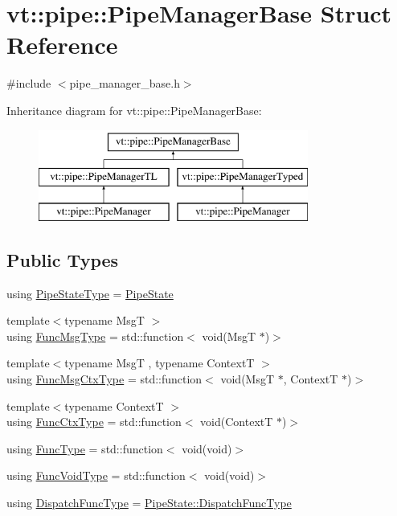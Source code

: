 \hypertarget{structvt_1_1pipe_1_1_pipe_manager_base}{}\section{vt\+:\+:pipe\+:\+:Pipe\+Manager\+Base Struct Reference}
\label{structvt_1_1pipe_1_1_pipe_manager_base}


{\ttfamily \#include $<$pipe\+\_\+manager\+\_\+base.\+h$>$}

Inheritance diagram for vt\+:\+:pipe\+:\+:Pipe\+Manager\+Base\+:\begin{figure}[H]
\begin{center}
\leavevmode
\includegraphics[height=3.000000cm]{structvt_1_1pipe_1_1_pipe_manager_base}
\end{center}
\end{figure}
\subsection*{Public Types}
\begin{DoxyCompactItemize}
\item 
using \hyperlink{structvt_1_1pipe_1_1_pipe_manager_base_a1364798bda487c9fb04879599f96c507}{Pipe\+State\+Type} = \hyperlink{structvt_1_1pipe_1_1_pipe_state}{Pipe\+State}
\item 
{\footnotesize template$<$typename MsgT $>$ }\\using \hyperlink{structvt_1_1pipe_1_1_pipe_manager_base_aa54eee64ab32a27777a672d49eb861f4}{Func\+Msg\+Type} = std\+::function$<$ void(MsgT $\ast$)$>$
\item 
{\footnotesize template$<$typename MsgT , typename ContextT $>$ }\\using \hyperlink{structvt_1_1pipe_1_1_pipe_manager_base_a73fdf82ece0411b3dc644c99b763f7a9}{Func\+Msg\+Ctx\+Type} = std\+::function$<$ void(MsgT $\ast$, ContextT $\ast$)$>$
\item 
{\footnotesize template$<$typename ContextT $>$ }\\using \hyperlink{structvt_1_1pipe_1_1_pipe_manager_base_ad8463823b6b4cfdb67c119d6d22e3bac}{Func\+Ctx\+Type} = std\+::function$<$ void(ContextT $\ast$)$>$
\item 
using \hyperlink{structvt_1_1pipe_1_1_pipe_manager_base_a7ddc75a14fa50cd8521641ef6f9ea78d}{Func\+Type} = std\+::function$<$ void(void)$>$
\item 
using \hyperlink{structvt_1_1pipe_1_1_pipe_manager_base_acd6f0c71f38f08d53f85e83b65406d77}{Func\+Void\+Type} = std\+::function$<$ void(void)$>$
\item 
using \hyperlink{structvt_1_1pipe_1_1_pipe_manager_base_a983e301505317c5ba2041461e7dec84a}{Dispatch\+Func\+Type} = \hyperlink{structvt_1_1pipe_1_1_pipe_state_ad81b637847d9c3185420c58c9272ed7d}{Pipe\+State\+::\+Dispatch\+Func\+Type}
\end{DoxyCompactItemize}
